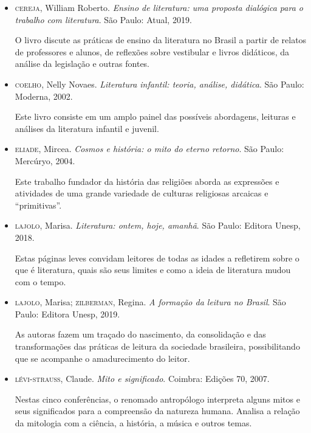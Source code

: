 \documentclass[11pt]{extarticle}
\begin{document}
\begin{itemize}
\item\textsc{cereja}, William Roberto. \textit{Ensino de literatura: uma proposta
dialógica para o trabalho com literatura}. São Paulo: Atual, 2019.

O livro discute as práticas de ensino da literatura no Brasil a partir
de relatos de professores e alunos, de reflexões sobre vestibular e
livros didáticos, da análise da legislação e outras fontes.

\item\textsc{coelho}, Nelly Novaes. \textit{Literatura infantil: teoria, análise,
didática}. São Paulo: Moderna, 2002.

Este livro consiste em um amplo painel das possíveis abordagens,
leituras e análises da literatura infantil e juvenil.

\item\textsc{eliade}, Mircea. \textit{Cosmos e história: o mito do eterno retorno}.
São Paulo: Mercúryo, 2004.

Este trabalho fundador da história das religiões aborda as expressões e
atividades de uma grande variedade de culturas religiosas arcaicas e
``primitivas''.

\item\textsc{lajolo}, Marisa. \textit{Literatura: ontem, hoje, amanhã}. São Paulo:
Editora Unesp, 2018.

Estas páginas leves convidam leitores de todas as idades a refletirem
sobre o que é literatura, quais são seus limites e como a ideia de
literatura mudou com o tempo.

\item\textsc{lajolo}, Marisa; \textsc{zilberman}, Regina. \textit{A formação da leitura no
Brasil}. São Paulo: Editora Unesp, 2019.

As autoras fazem um traçado do nascimento, da consolidação e das
transformações das práticas de leitura da sociedade brasileira,
possibilitando que se acompanhe o amadurecimento do leitor.

\item\textsc{lévi-strauss}, Claude. \textit{Mito e significado}. Coimbra: Edições 70,
2007.

Nestas cinco conferências, o renomado antropólogo interpreta alguns
mitos e seus significados para a compreensão da natureza humana. Analisa
a relação da mitologia com a ciência, a história, a música e outros
temas.
\end{itemize}
\end{document}
